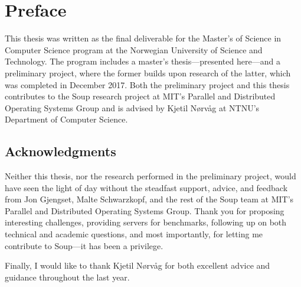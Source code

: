 \section*{Preface}

This thesis was written as the final deliverable for the Master's of Science in
Computer Science program at the Norwegian University of Science and Technology.
The program includes a master's thesis---presented here---and a preliminary
project, where the former builds upon research of the latter, which was
completed in December 2017. Both the preliminary project and this thesis
contributes to the Soup research project at MIT's Parallel and Distributed
Operating Systems Group and is advised by Kjetil Nørvåg at NTNU's Department of
Computer Science.

\subsection*{Acknowledgments}

Neither this thesis, nor the research performed in the preliminary project,
would have seen the light of day without the steadfast support, advice, and
feedback from Jon Gjengset, Malte Schwarzkopf, and the rest of the Soup team at
MIT's Parallel and Distributed Operating Systems Group. Thank you for proposing
interesting challenges, providing servers for benchmarks, following up on both
technical and academic questions, and most importantly, for letting me
contribute to Soup---it has been a privilege.

Finally, I would like to thank Kjetil Nørvåg for both excellent advice and
guidance throughout the last year.

\newpage
